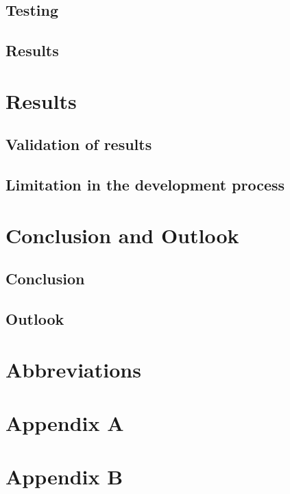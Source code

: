 \section{Testing}
\section{Results} 

\chapter{Results}
\section{Validation of results}
\section{Limitation in the development process}

\chapter{Conclusion and Outlook}
\section{Conclusion}
\section{Outlook}


\chapter{Abbreviations}


\printbibliography[heading=bibintoc]

\chapter{Appendix A}\label{appendix a}

\chapter{Appendix B}\label{appendix b}
%


